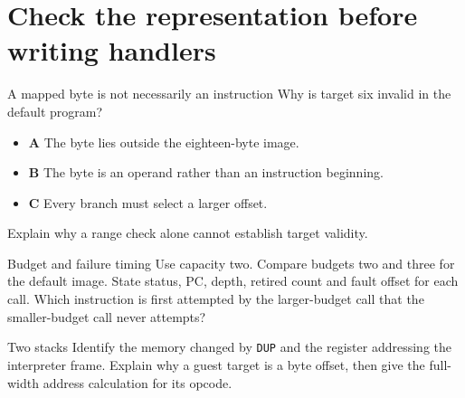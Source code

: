 \section{Check the representation before writing handlers}\label{vm-questions}
\begin{MARSExercise}{A mapped byte is not necessarily an instruction}
  Why is target six invalid in the default program?
  \begin{itemize}
    \item \textbf{A} The byte lies outside the eighteen-byte image.
    \item \textbf{B} The byte is an operand rather than an instruction beginning.
    \item \textbf{C} Every branch must select a larger offset.
  \end{itemize}
  Explain why a range check alone cannot establish target validity.
\end{MARSExercise}
\begin{MARSExercise}{Budget and failure timing}
  Use capacity two. Compare budgets two and three for the default image. State status,
  PC, depth, retired count and fault offset for each call. Which instruction is first
  attempted by the larger-budget call that the smaller-budget call never attempts?
\end{MARSExercise}
\begin{MARSExercise}{Two stacks}
  Identify the memory changed by \texttt{DUP} and the register addressing the interpreter
  frame. Explain why a guest target is a byte offset, then give the full-width address
  calculation for its opcode.
\end{MARSExercise}
